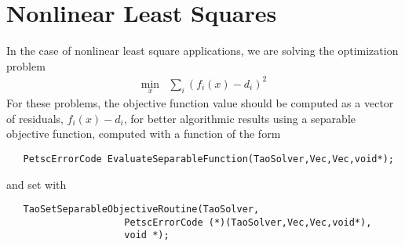 \section{Nonlinear Least Squares}\label{sec:evalsof}
In the case of nonlinear least square applications, we are solving
the optimization problem
\[
\begin{array}{ll}
\displaystyle \min_{x} & \displaystyle \sum_i (f_i(x) - d_i)^2
\end{array}
\]
For these problems, the objective function value should be computed as a 
vector of residuals, $f_i(x) - d_i$, for better algorithmic results using 
a separable objective function, computed with a function of the form
\begin{verbatim}
   PetscErrorCode EvaluateSeparableFunction(TaoSolver,Vec,Vec,void*);
\end{verbatim}
and set with
\begin{verbatim}
   TaoSetSeparableObjectiveRoutine(TaoSolver,
                     PetscErrorCode (*)(TaoSolver,Vec,Vec,void*),
                     void *);
\end{verbatim}

\begin{comment}
The computation of the Jacobian of the separable objective routine 
should be in a routine that looks like
\begin{verbatim}
   PetscErrorCode EvaluateJacobian(TaoSolver,Vec,Mat*,Mat*,MatStructure*,
                     void*);
\end{verbatim}
This function can be registered with TAO using the function
\begin{verbatim}
   TaoSetJacobianRoutine(TaoSolver,Mat J, Mat Jpre,
                     PetscErrorCode (*)(TaoSolver,Vec,Mat*,Mat*,
                     MatStructure*,void*), void *);
\end{verbatim}
The first argument is the TAO solver object, the second and third arguments
are the Mat object where the Jacobian will be stored and the Mat object
that will be used for the preconditioning (they may be the same). The fourth 
argument is the function that evaluates the Jacobian, 
and the fifth argument is a pointer to a user defined context,
cast as a {\tt void*} pointer.
\end{comment}

